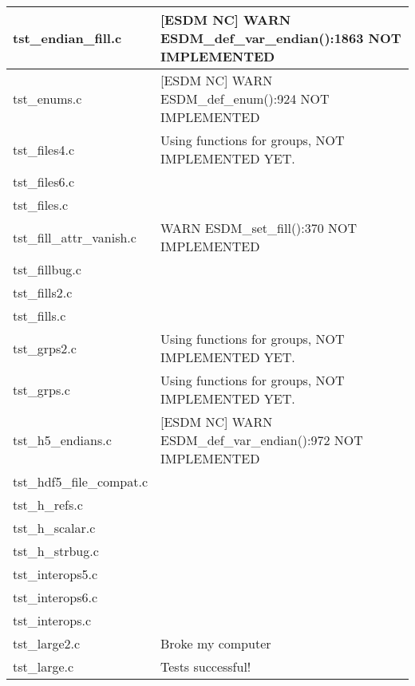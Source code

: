 \begin{table}[H]
\begin{tabular}{|l|l|}
tst\_endian\_fill.c   &    [ESDM NC] WARN ESDM\_def\_var\_endian():1863 NOT IMPLEMENTED   \\ \hline
tst\_enums.c   &   [ESDM NC] WARN ESDM\_def\_enum():924 NOT IMPLEMENTED    \\ \hline
tst\_files4.c   &   Using functions for groups, NOT IMPLEMENTED YET.    \\ \hline
tst\_files6.c   &       \\ \hline
tst\_files.c   &       \\ \hline
tst\_fill\_attr\_vanish.c   &   WARN ESDM\_set\_fill():370 NOT IMPLEMENTED    \\ \hline
tst\_fillbug.c   &       \\ \hline
tst\_fills2.c   &       \\ \hline
tst\_fills.c   &       \\ \hline
tst\_grps2.c   &   Using functions for groups, NOT IMPLEMENTED YET.    \\ \hline
tst\_grps.c   &    Using functions for groups, NOT IMPLEMENTED YET.   \\ \hline
tst\_h5\_endians.c   &   [ESDM NC] WARN ESDM\_def\_var\_endian():972 NOT IMPLEMENTED    \\ \hline
tst\_hdf5\_file\_compat.c   &       \\ \hline
tst\_h\_refs.c   &       \\ \hline
tst\_h\_scalar.c   &       \\ \hline
tst\_h\_strbug.c   &       \\ \hline
tst\_interops5.c   &       \\ \hline
tst\_interops6.c   &       \\ \hline
tst\_interops.c   &       \\ \hline
tst\_large2.c   &   Broke my computer    \\ \hline
tst\_large.c   &    Tests successful!   \\ \hline
\hline
\end{tabular}
\caption{}
\end{table}

\clearpage

